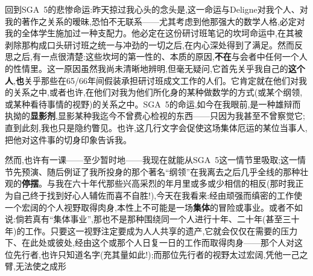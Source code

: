 回到SGA~5的悲惨命运:昨天掠过我心头的念头是,这一命运与Deligne对我个人、对我的著作之关系的暧昧,恐怕不无联系——尤其考虑到他那强大的数学人格,必定对我的全体学生施加过一种支配力。他必定在这份研讨班笔记的坎坷命运中,在其被剥除那构成口头研讨班之统一与冲劲的一切之后,在内心深处得到了满足。然而反思之后,有一点很清楚:这些坎坷的第一性的、本质的原因,\textbf{不在}与会者中任何一个人的性情里。这一原因虽然我尚未清晰地辨明,但毫无疑问,它首先关乎我自己的\textbf{这个人},\textbf{也}关乎那些在65/66年间假装承担研讨班成文工作的人们。它肯定就在他们对我的关系之中,或者也许,在他们对我为他们所化身的某种做数学的方式(或某个纲领,或某种看待事情的视野)的关系之中。SGA~5的命运,如今在我眼前,是一种雄辩而执拗的\textbf{显影剂},显影某种我迄今不曾费心检视的东西——只因为我甚至不曾察觉它;直到此刻,我也只是隐约瞥见。也许,这几行文字会促使这场集体厄运的某位当事人,把他对这件事的切身印象告诉我。

\pmark {}然而,也许有一课——至少暂时地——我现在就能从SGA~5这一情节里吸取;这一情节先预演、随后例证了我所投身的那个著名“纲领”在我离去之后几乎全线的那种壮观的\textbf{停摆}。与我在六十年代那些兴高采烈的年月里或多或少相信的相反(那时我正为自己终于找到好心人辅佐而喜不自胜!),今天在我看来:经由顽强而缜密的工作使一个宏阔的个人视野取得肉身,本性上不可能是一场\textbf{集体}的冒险或事业。或者不如说:倘若真有“集体事业”,那也不是那种围绕同一个人进行十年、二十年(甚至三十年)的工作。只要这一视野注定要成为人人共享的遗产,它就会仅仅在需要的压力下、在此处或彼处,经由这个或那个人日复一日的工作而取得肉身——那个人对这位先行者,也许只知道名字(充其量如此!);而那位先行者的视野太过宏阔,凭他一己之臂,无法使之成形


